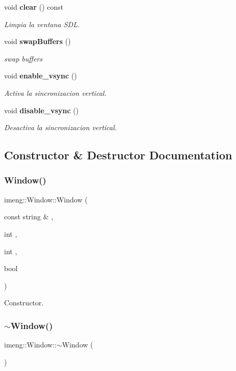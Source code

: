 \begin{DoxyCompactItemize}
void \textbf{ clear} () const
\begin{DoxyCompactList}\small\item\em Limpia la ventana S\+DL. \end{DoxyCompactList}\item 
void \textbf{ swap\+Buffers} ()
\begin{DoxyCompactList}\small\item\em swap buffers \end{DoxyCompactList}\item 
void \textbf{ enable\+\_\+vsync} ()
\begin{DoxyCompactList}\small\item\em Activa la sincronizacion vertical. \end{DoxyCompactList}\item 
void \textbf{ disable\+\_\+vsync} ()
\begin{DoxyCompactList}\small\item\em Desactiva la sincronizacion vertical. \end{DoxyCompactList}\end{DoxyCompactItemize}


\subsection{Constructor \& Destructor Documentation}
\mbox{\label{classimeng_1_1_window_abc5c85558231ac07df6c61064f60dca6}} 
\subsubsection{Window()}
{\footnotesize\ttfamily imeng\+::\+Window\+::\+Window (\begin{DoxyParamCaption}\item[{const string \&}]{,  }\item[{int}]{,  }\item[{int}]{,  }\item[{bool}]{ }\end{DoxyParamCaption})}



Constructor. 

\mbox{\label{classimeng_1_1_window_a0b47690803c2671746d1ff3d47ac6557}} 
\subsubsection{$\sim$Window()}
{\footnotesize\ttfamily imeng\+::\+Window\+::$\sim$\+Window (\begin{DoxyParamCaption}{ }\end{DoxyParamCaption})}



